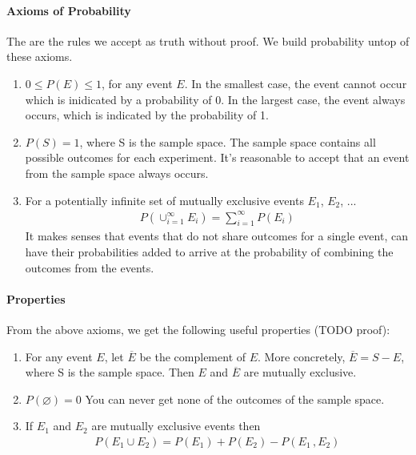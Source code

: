 \paragraph{Axioms of Probability} The are the rules we accept as truth without
proof. We build probability untop of these axioms.

\begin{enumerate}
	\item $0 \le P(E) \le 1$, for any event $E$. In the smallest case, the event
		cannot occur which is inidicated by a probability of 0. In the largest case,
		the event always occurs, which is indicated by the probability of 1.
	\item $P(S) = 1$, where S is the sample space. The sample space contains all
		possible outcomes for each experiment. It's reasonable to accept that an
		event from the sample space always occurs.
	\item For a potentially infinite set of mutually exclusive events $E_1$,
		$E_2$, ... 
		\begin{equation*} \begin{split}
			P( \cup_{i=1}^\infty E_i ) = \sum_{i=1}^\infty P(E_i)
		\end{split} \end{equation*}
		It makes senses that events that do not share outcomes for a single event,
		can have their probabilities added to arrive at the probability of combining
		the outcomes from the events.
\end{enumerate}

\paragraph{Properties} From the above axioms, we get the following useful
properties (TODO proof): %
\begin{enumerate}
	\item For any event $E$, let $\overline{E}$ be the complement of $E$. More
		concretely, $\overline{E} = S - E$, where S is the sample space. Then $E$
		and $\overline{E}$ are mutually exclusive.
	\item $P(\varnothing) = 0$ You can never get none of the outcomes of the
		sample space.
	\item If $E_1$ and $E_2$ are mutually exclusive events then
		\begin{equation*} \begin{split}
			P(E_1 \cup E_2) = P(E_1) + P(E_2) - P(E_1\, , E_2)
		\end{split} \end{equation*}
\end{enumerate}

